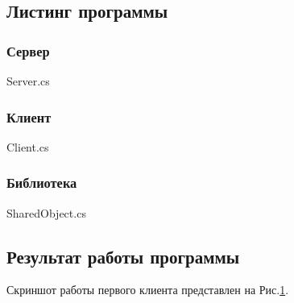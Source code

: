 \documentclass[russian,utf8,pointsection]{eskdtext}
\begin{document}
       	\subsection{Листинг программы}
       	\subsubsection{Сервер}
       	
       	{Server.cs}  
       	
      
     \subsubsection{Клиент}
    
    {Client.cs}  
    
       
        \subsubsection{Библиотека}
        
        {SharedObject.cs}  
       	
       	\subsection{Результат работы программы}
       	Скриншот работы первого клиента представлен на Рис.\ref{ris:1-2}.
       	\begin{figure}[!h]
       		\caption{}
       		\label{ris:1-2}
       	\end{figure}
       	
\end{document}
